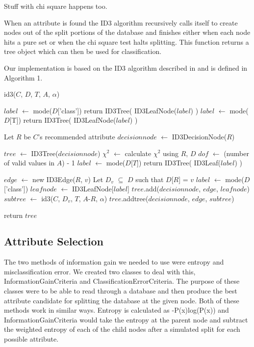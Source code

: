 \documentclass{IEEEtran}
\begin{document}
Stuff with chi square happens too.

When an attribute is found the ID3 algorithm recursively calls itself to
create nodes out of the split portions of the database and finishes
either when each node hits a pure set or when the chi square test
halts splitting. This function returns a tree object which can then be 
used for classification.

Our implementation is based on the ID3 algorithm described
in \parencite{quinlan1986induction} and is defined in Algorithm 1.


\begin{algorithm}
\label{id3algorithm}
\caption{id3($C$, $D$, $T$, $A$, $\alpha$)}
\begin{algorithmic}
  \State $label$ $\leftarrow$ mode($D$['class'])
  \State return ID3Tree( ID3LeafNode($label$) )
\EndIf
{}
  \State $label$ $\leftarrow$ mode($D$[T])
  \State return ID3Tree( ID3LeafNode($label$) )
\EndIf

\State Let $R$ be $C$'s recommended attribute
\State $decisionnode$ $\leftarrow$ ID3DecisionNode($R$)

\State $tree$ $\leftarrow$ ID3Tree($decisionnode$)
  \State $\chi^2$ $\leftarrow$ calculate $\chi^2$ using $R$, $D$
  \State $dof$ $\leftarrow$ (number of valid values in $A$) - 1
    \State $label$ $\leftarrow$ mode($D$[$T$])
    \State return ID3Tree( ID3Leaf($label$) )
  \EndIf

  \State $edge$ $\leftarrow$ new ID3Edge($R$, $v$)
  \State Let $D_v$ $\subseteq$ $D$ such that $D$[$R$] = $v$
    \State $label$ $\leftarrow$ mode($D$['class'])
    \State $leafnode$ $\leftarrow$ ID3LeafNode[$label$]
    \State $tree$.add($decisionnode$, $edge$, $leafnode$)
  \Else
    \State $subtree$ $\leftarrow$ id3($C$, $D_v$, $T$, $A$-$R$, $\alpha$)
    \State $tree$.addtree($decisionnode$, $edge$, $subtree$)
  \EndIf

  return $tree$
\EndFor

\end{algorithmic}
\end{algorithm}


\subsection{Attribute Selection}
The two methods of information gain we needed to use were entropy and
misclassification error. We created two classes to deal with this,
InformationGainCriteria and ClassificationErrorCriteria. The purpose
of these classes were to be able to read through a database and then
produce the best attribute candidate for splitting the database at the
given node. Both of these methods work in similar ways. Entropy is
calculated as -P(x)log(P(x)) and InformationGainCriteria would take
the entropy at the parent node and subtract the weighted entropy of
each of the child nodes after a simulated split for each possible
attribute.
\end{document}

